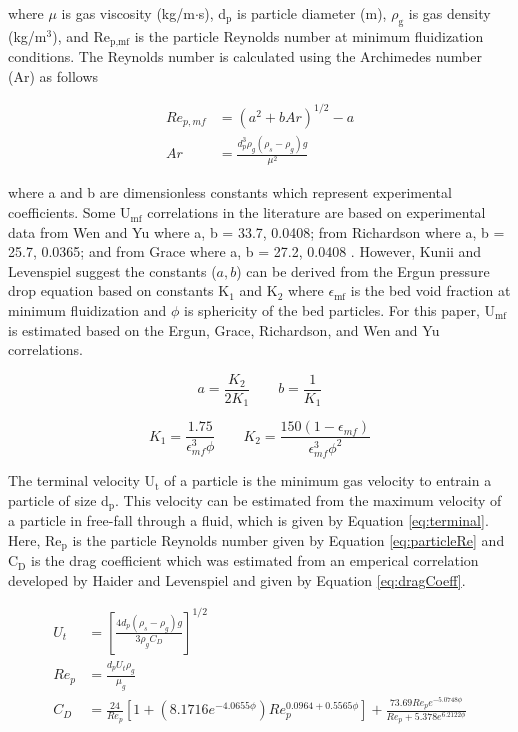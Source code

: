 \noindent where $\mu$ is gas viscosity (kg/m$\cdot$s), d$_\text{p}$ is particle diameter (m), $\rho_\text{g}$ is gas density (kg/m$^3$), and Re$_\text{p,mf}$ is the particle Reynolds number at minimum fluidization conditions. The Reynolds number is calculated using the Archimedes number (Ar) as follows

\begin{align}
    Re_{p,mf} &= \left( a^2 + b Ar \right)^{1/2} - a \\
    Ar &= \frac{d_p^3 \rho_g (\rho_s - \rho_g) g}{\mu^2}
\end{align}

\noindent where a and b are dimensionless constants which represent experimental coefficients. Some U$_\text{mf}$ correlations in the literature are based on experimental data from Wen and Yu where a, b = 33.7, 0.0408; from Richardson where a, b = 25.7, 0.0365; and from Grace where a, b = 27.2, 0.0408 \cite{Levenspiel-1991}. However, Kunii and Levenspiel \cite{Levenspiel-1991} suggest the constants ($a, b$) can be derived from the Ergun pressure drop equation based on constants K$_1$ and K$_2$ where $\epsilon_\text{mf}$ is the bed void fraction at minimum fluidization and $\phi$ is sphericity of the bed particles. For this paper, U$_\text{mf}$ is estimated based on the Ergun, Grace, Richardson, and Wen and Yu correlations.

\begin{equation}
    a = \frac{K_2}{2 K_1} \qquad
    b = \frac{1}{K_1}
\end{equation}

\begin{equation}
    K_1 = \frac{1.75}{\epsilon_{mf}^3 \phi} \qquad
    K_2 = \frac{150(1-\epsilon_{mf})}{\epsilon_{mf}^3 \phi^2}
\end{equation}

The terminal velocity U$_\text{t}$ of a particle is the minimum gas velocity to entrain a particle of size d$_\text{p}$. This velocity can be estimated from the maximum velocity of a particle in free-fall through a fluid, which is given by Equation \ref{eq:terminal}. Here, Re$_\text{p}$ is the particle Reynolds number given by Equation \ref{eq:particleRe} and C$_\text{D}$ is the drag coefficient which was estimated from an emperical correlation developed by Haider and Levenspiel \cite{haider1989drag} and given by Equation \ref{eq:dragCoeff}.

\begin{align}
    U_{t} &= \left [\frac{4d_{p} \left (\rho_{s}-\rho_{g} \right )g}{3\rho_{g}C_{D}}\right ]^{1/2} \label{eq:terminal} \\
    Re_{p} &= \frac{d_{p}U_{t}\rho_{g}}{\mu_{g}} \label{eq:particleRe} \\
    C_{D} &= \frac{24}{Re_{p}}\left [ 1+\left ( 8.1716e^{-4.0655\phi } \right )Re_{p}^{0.0964+0.5565\phi} \right ]+\frac{73.69Re_{p}e^{-5.0748\phi}}{Re_{p}+5.378e^{6.2122\phi}} \label{eq:dragCoeff}
\end{align}

